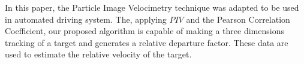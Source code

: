 In this paper, the Particle Image Velocimetry technique was adapted to be used in automated driving system.
The, applying $PIV$ and the Pearson Correlation Coefficient, our proposed algorithm 
is capable of making a three dimensions tracking of a target 
and generates a relative departure factor. These data are used to estimate the 
relative velocity of the target.
